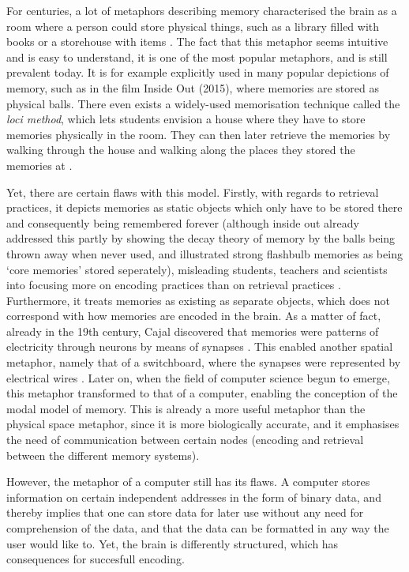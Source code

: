 For centuries, a lot of metaphors describing memory characterised the brain as a room where a person could store physical things, such as a library filled with books or a storehouse with items \cite{roediger}. The fact that this metaphor seems intuitive and is easy to understand, it is one of the most popular metaphors, and is still prevalent today. It is for example explicitly used in many popular depictions of memory, such as in the film Inside Out (2015), where memories are stored as physical balls. There even exists a widely-used memorisation technique called the \emph{loci method}, which lets students envision a house where they have to store memories physically in the room. They can then later retrieve the memories by walking through the house and walking along the places they stored the memories at \cite{cognitivepsychology}.

Yet, there are certain flaws with this model. Firstly, with regards to retrieval practices, it depicts memories as static objects which only have to be stored there and consequently being remembered forever (although inside out already addressed this partly by showing the decay theory of memory by the balls being thrown away when never used, and illustrated strong flashbulb memories as being `core memories' stored seperately), misleading students, teachers and scientists into focusing more on encoding practices than on retrieval practices \cite{karpicke4}. Furthermore, it treats memories as existing as separate objects, which does not correspond with how memories are encoded in the brain. As a matter of fact, already in the 19th century, Cajal discovered that memories were patterns of electricity through neurons by means of synapses \cite{longtermpotentiation}. This enabled another spatial metaphor, namely that of a switchboard, where the synapses were represented by electrical wires \cite{roediger}. Later on, when the field of computer science begun to emerge, this metaphor transformed to that of a computer, enabling the conception of the modal model of memory. This is already a more useful metaphor than the physical space metaphor, since it is more biologically accurate, and it emphasises the need of communication between certain nodes (encoding and retrieval between the different memory systems).

However, the metaphor of a computer still has its flaws. A computer stores information on certain independent addresses in the form of binary data, and thereby implies that one can store data for later use without any need for comprehension of the data, and that the data can be formatted in any way the user would like to. Yet, the brain is differently structured, which has consequences for succesfull encoding.

